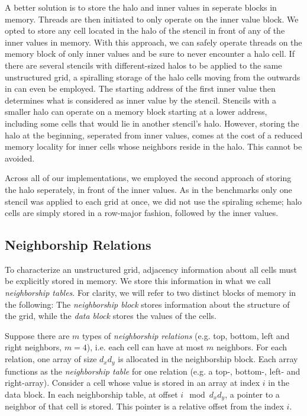 A better solution is to store the halo and inner values in seperate blocks in memory. Threads are then initiated to only operate on the inner value block. We opted to store any cell located in the halo of the stencil in front of any of the inner values in memory. With this approach, we can safely operate threads on the memory block of only inner values and be sure to never encounter a halo cell. If there are several stencils with different-sized halos to be applied to the same unstructured grid, a spiralling storage of the halo cells moving from the outwards in can even be employed. The starting address of the first inner value then determines what is considered as inner value by the stencil. Stencils with a smaller halo can operate on a memory block starting at a lower address, including some cells that would lie in another stencil's halo. However, storing the halo at the beginning, seperated from inner values, comes at the cost of a reduced memory locality for inner cells whose neighbors reside in the halo. This cannot be avoided.

Across all of our implementations, we employed the second approach of storing the halo seperately, in front of the inner values. As in the benchmarks only one stencil was applied to each grid at once, we did not use the spiraling scheme; halo cells are simply stored in a row-major fashion, followed by the inner values.

\subsection{Neighborship Relations}
\label{sec:unstructured-neighborships}

To characterize an unstructured grid, adjacency information about all cells must be explicitly stored in memory. We store this information in what we call \emph{neighborship tables}.  For clarity, we will refer to two distinct blocks of memory in the following: The \emph{neighborship block} stores information about the structure of the grid, while the \emph{data block} stores the values of the cells.

Suppose there are $m$ types of \emph{neighborship relations} (e.g. top, bottom, left and right neighbors, $m=4$), i.e. each cell can have at most $m$ neighbors. For each relation, one array of size $d_xd_y$ is allocated in the neighborship block. Each array functions as the \emph{neighborship table} for one relation (e.g. a top-, bottom-, left- and right-array). Consider a cell whose value is stored in an array at index $i$ in the data block. In each neighborship table, at offset $i \mod d_xd_y$, a pointer to a neighbor of that cell is stored. This pointer is a relative offset from the index $i$.

